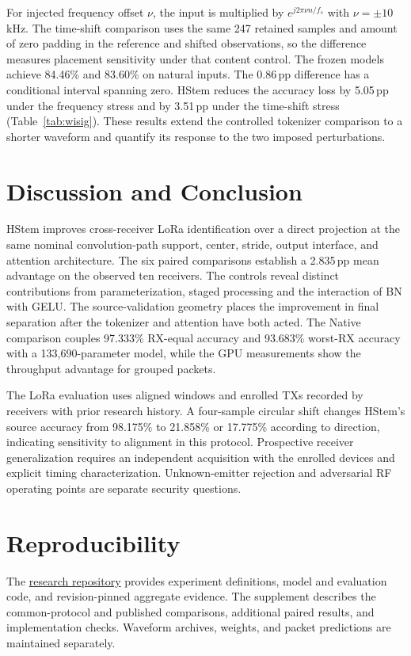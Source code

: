 \documentclass[journal]{IEEEtran}
\begin{document}
For injected frequency offset \(\nu\), the input is multiplied by \(e^{j2\pi \nu n/f_s}\) with \(\nu=\pm10\) kHz. The time-shift comparison uses the same 247 retained samples and amount of zero padding in the reference and shifted observations, so the difference measures placement sensitivity under that content control. The frozen models achieve 84.46\% and 83.60\% on natural inputs. The 0.86\,pp difference has a conditional interval spanning zero. HStem reduces the accuracy loss by 5.05\,pp under the frequency stress and by 3.51\,pp under the time-shift stress (Table~\ref{tab:wisig}). These results extend the controlled tokenizer comparison to a shorter waveform and quantify its response to the two imposed perturbations.

\begin{table}[!t]\centering
\caption{Matched WiSig stress test. Positive values favor HStem. Differences and conditional 95\% receiver intervals are in pp.}
\label{tab:wisig}
\end{table}

\section{Discussion and Conclusion}
HStem improves cross-receiver LoRa identification over a direct projection at the same nominal convolution-path support, center, stride, output interface, and attention architecture. The six paired comparisons establish a 2.835\,pp mean advantage on the observed ten receivers. The controls reveal distinct contributions from parameterization, staged processing and the interaction of BN with GELU. The source-validation geometry places the improvement in final separation after the tokenizer and attention have both acted. The Native comparison couples 97.333\% RX-equal accuracy and 93.683\% worst-RX accuracy with a 133,690-parameter model, while the GPU measurements show the throughput advantage for grouped packets.

The LoRa evaluation uses aligned windows and enrolled TXs recorded by receivers with prior research history. A four-sample circular shift changes HStem's source accuracy from 98.175\% to 21.858\% or 17.775\% according to direction, indicating sensitivity to alignment in this protocol. Prospective receiver generalization requires an independent acquisition with the enrolled devices and explicit timing characterization. Unknown-emitter rejection and adversarial RF operating points are separate security questions.

\section*{Reproducibility}
The \href{https://github.com/hanCChan/crossatten}{research repository} provides experiment definitions, model and evaluation code, and revision-pinned aggregate evidence. The supplement describes the common-protocol and published comparisons, additional paired results, and implementation checks. Waveform archives, weights, and packet predictions are maintained separately.



\end{document}
